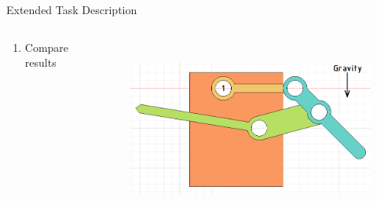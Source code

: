 \documentclass[aspectratio=169]{beamer}
\newcommand{\fbckg}[1]{\usebackgroundtemplate{\texttt{[image: \#1]}}}%
\begin{document}
\begin{frame}[t]{Extended Task Description}
\begin{columns}[T,onlytextwidth]
\begin{column}{0.59\textwidth}
\begin{enumerate}
        \item Compare results
    \end{enumerate}
        \end{column}
        \begin{column}{0.39\textwidth}
            \vspace{1cm}
            \begin{figure}[H]
                \centering\includegraphics[height=6cm,width=1\textwidth,keepaspectratio]{task_descr.png}
                \label{fig:task_descr.png}
            \end{figure}
        \end{column}
    \end{columns}
\end{frame}


\fbckg{fibeamer/figs/last_page.png}
\frame[plain]{}
\end{document}
